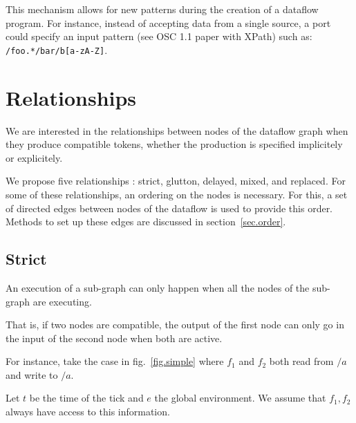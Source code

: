 \documentclass{article}
\begin{document}
    This mechanism allows for new patterns during the creation of a dataflow program.
    For instance, instead of accepting data from a single source, a port could specify an input pattern (see OSC 1.1 paper with XPath) such as: \lstinline|/foo.*/bar/b[a-zA-Z]|.
	
	
    
	\section{Relationships}
    \label{sec.relationships}
    We are interested in the relationships between nodes of the dataflow graph when they produce compatible tokens, whether the production is specified implicitely or explicitely.
    
    We propose five relationships : strict, glutton, delayed, mixed, and replaced. 
    For some of these relationships, an ordering on the nodes is necessary. 
    For this, a set of directed edges between nodes of the dataflow is used to provide this order.
    Methods to set up these edges are discussed in section~\ref{sec.order}.
    
    \subsection{Strict}
    An execution of a sub-graph can only happen when all the nodes of the sub-graph are executing.
    
    That is, if two nodes are compatible, the output of the first node can only go in the input of the second node when both are active.
    
    For instance, take the case in fig.~\ref{fig.simple} where $f_1$ and $f_2$ both read from $/a$ and write to $/a$.
    
    Let $t$ be the time of the tick and $e$ the global environment. 
    We assume that $f_1, f_2$ always have access to this information.
    
\end{document}
